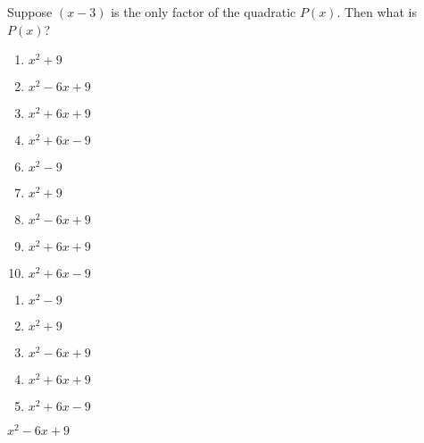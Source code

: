 

  Suppose $(x-3)$ is the only factor of the quadratic $P(x)$.  Then what is $P(x)$?


\ifsat
	\begin{enumerate}[label=\Alph*)]
		\item  $x^{2}+9$
		\item  $x^{2}-6x+9$%
		\item  $x^{2}+6x+9$
		\item  $x^2+6x-9$
	\end{enumerate}
\else
\fi

\ifacteven
	\begin{enumerate}[label=\textbf{\Alph*.},itemsep=\fill,align=left]
		\setcounter{enumii}{5}
		\item   $x^{2}-9$
		\item  $x^{2}+9$
		\item  $x^{2}-6x+9$%
		\addtocounter{enumii}{1}
		\item  $x^{2}+6x+9$
		\item  $x^2+6x-9$
	\end{enumerate}
\else
\fi

\ifactodd
	\begin{enumerate}[label=\textbf{\Alph*.},itemsep=\fill,align=left]
		\item   $x^{2}-9$
		\item  $x^{2}+9$
		\item  $x^{2}-6x+9$%
		\item  $x^{2}+6x+9$
		\item  $x^2+6x-9$
	\end{enumerate}
\else
\fi

\ifgridin
  $x^{2}-6x+9$%
		
\else
\fi

